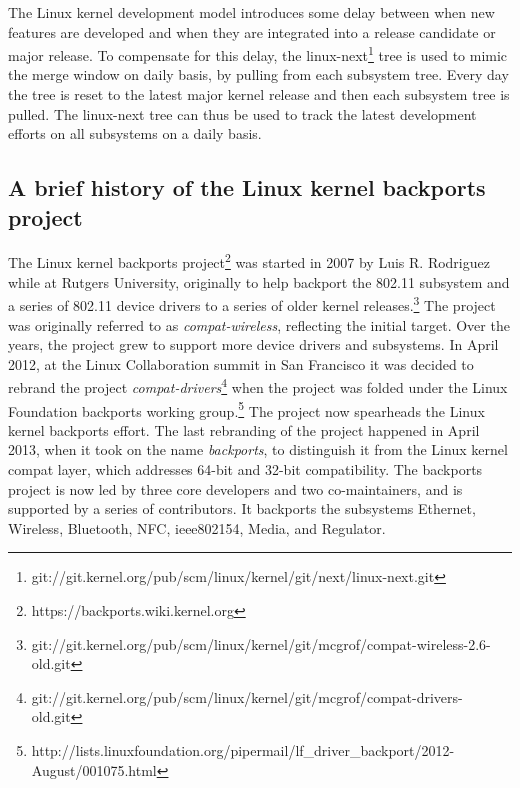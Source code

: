 The Linux kernel development model introduces some delay between when new
features are developed and when they are integrated into a release
candidate or major release.  To compensate for this delay, the
linux-next\footnote{git://git.kernel.org/pub/scm/linux/kernel/git/next/linux-next.git}
tree is used to mimic the merge window on daily basis, by pulling from each
subsystem tree. Every day the tree is reset to the latest major
kernel release and then each subsystem tree is pulled. The linux-next tree
can thus be used to track the latest development efforts on all subsystems on a
daily basis.

\subsection{A brief history of the Linux kernel backports project}

The Linux kernel backports
project\footnote{https://backports.wiki.kernel.org} was started in 2007 by
Luis R. Rodriguez while at Rutgers University, originally to help backport
the 802.11 subsystem and a series of 802.11 device drivers to a series of
older kernel
releases.\footnote{git://git.kernel.org/pub/scm/linux/kernel/git/mcgrof/compat-wireless-2.6-old.git}
The project was originally referred to as {\em compat-wireless}, reflecting
the initial target.  Over the years, the project grew to support more
device drivers and subsystems. In April 2012, at the Linux Collaboration
summit in San Francisco it was decided to rebrand the project {\em
  compat-drivers}\footnote{git://git.kernel.org/pub/scm/linux/kernel/git/mcgrof/compat-drivers-old.git}
when the project was folded under the Linux Foundation backports working
group.\footnote{http://lists.linuxfoundation.org/pipermail/lf\_driver\_backport/2012-August/001075.html}
The project now spearheads the Linux kernel backports effort. The last
rebranding of the project happened in April 2013, when it took on the name
{\em backports}, to distinguish it from the Linux kernel compat layer,
which addresses 64-bit and 32-bit compatibility.  The backports project is
now led by three core developers and two co-maintainers, and is supported
by a series of contributors.  It backports the subsystems Ethernet,
Wireless, Bluetooth, NFC, ieee802154, Media, and Regulator.


